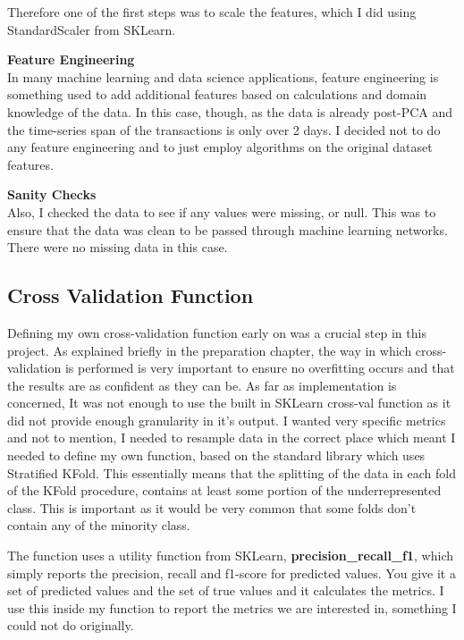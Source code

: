 \documentclass[12pt,a4paper,twoside]{report}
\begin{document}
Therefore one of the first steps was to scale the features, which I did using StandardScaler from SKLearn. 

\textbf{Feature Engineering}\\

In many machine learning and data science applications, feature engineering is something used to add additional features based on calculations and domain knowledge of the data. In this case, though, as the data is already post-PCA and the time-series span of the transactions is only over 2 days. I decided not to do any feature engineering and to just employ algorithms on the original dataset features.

\textbf{Sanity Checks}\\

Also, I checked the data to see if any values were missing, or null. This was to ensure that the data was clean to be passed through machine learning networks. There were no missing data in this case.

\subsection{Cross Validation Function}

Defining my own cross-validation function early on was a crucial step in this project. As explained briefly in the preparation chapter, the way in which cross-validation is performed is very important to ensure no overfitting occurs and that the results are as confident as they can be. As far as implementation is concerned, It was not enough to use the built in SKLearn cross-val function as it did not provide enough granularity in it's output. I wanted very specific metrics and not to mention, I needed to resample data in the correct place which meant I needed to define my own function, based on the standard library which uses Stratified KFold. This essentially means that the splitting of the data in each fold of the KFold procedure, contains at least some portion of the underrepresented class. This is important as it would be very common that some folds don't contain any of the minority class. 

The function uses a utility function from SKLearn, \textbf{precision\_recall\_f1}, which simply reports the precision, recall and f1-score for predicted values. You give it a set of predicted values and the set of true values and it calculates the metrics. I use this inside my function to report the metrics we are interested in, something I could not do originally. 
\end{document}
